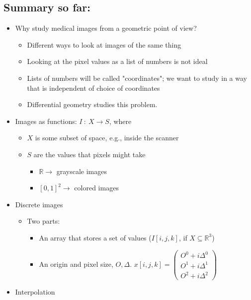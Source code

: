 \documentclass[10pt]{article}
\newcommand{\R}{\mathbb{R}}
\begin{document}
\subsection*{Summary so far:}
\begin{itemize}
    \item Why study medical images from a geometric point of view?
    \begin{itemize}
        \item Different ways to look at images of the same thing
        \item Looking at the pixel values as a list of numbers is not ideal
        \item Lists of numbers will be called "coordinates"; we want to study in a way that is independent of choice of coordinates
        \item Differential geometry studies this problem.
    \end{itemize}
    \item Images as functions: $I \::\: X \rightarrow S$, where
    \begin{itemize}
        \item $X$ is some subset of space, e.g., inside the scanner
        \item $S$ are the values that pixels might take
        \begin{itemize}
            \item $\R \rightarrow$ grayscale images
            \item $[0, 1]^2 \rightarrow$ colored images
        \end{itemize}
    \end{itemize}
    \item Discrete images
    \begin{itemize}
        \item Two parts:
        \begin{itemize}
            \item An array that stores a set of values ($I[i, j, k]$, if $X \subseteq \R^3$)
            \item An origin and pixel size, $O, \Delta$.  $x[i, j, k] = \begin{pmatrix}
            O^0 + i \Delta^0 \\ O^1 + i \Delta^1 \\ O^2 + i \Delta^2
            \end{pmatrix}$
        \end{itemize}
    \end{itemize}
    \item Interpolation

\end{itemize}
\end{document}
